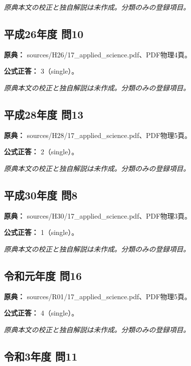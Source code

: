 \par\textit{原典本文の校正と独自解説は未作成。分類のみの登録項目。}

\subsection{平成26年度 問10}
\label{q:h26-reg-applied-10}

\noindent\textbf{原典：} sources/H26/17\_applied\_science.pdf、PDF物理4頁。

\textbf{公式正答：} 3（single）。

\par\textit{原典本文の校正と独自解説は未作成。分類のみの登録項目。}

\subsection{平成28年度 問13}
\label{q:h28-reg-applied-13}

\noindent\textbf{原典：} sources/H28/17\_applied\_science.pdf、PDF物理5頁。

\textbf{公式正答：} 2（single）。

\par\textit{原典本文の校正と独自解説は未作成。分類のみの登録項目。}

\subsection{平成30年度 問8}
\label{q:h30-reg-applied-08}

\noindent\textbf{原典：} sources/H30/17\_applied\_science.pdf、PDF物理3頁。

\textbf{公式正答：} 1（single）。

\par\textit{原典本文の校正と独自解説は未作成。分類のみの登録項目。}

\subsection{令和元年度 問16}
\label{q:r01-reg-applied-16}

\noindent\textbf{原典：} sources/R01/17\_applied\_science.pdf、PDF物理5頁。

\textbf{公式正答：} 4（single）。

\par\textit{原典本文の校正と独自解説は未作成。分類のみの登録項目。}

\subsection{令和3年度 問11}
\label{q:r03-reg-applied-11}

